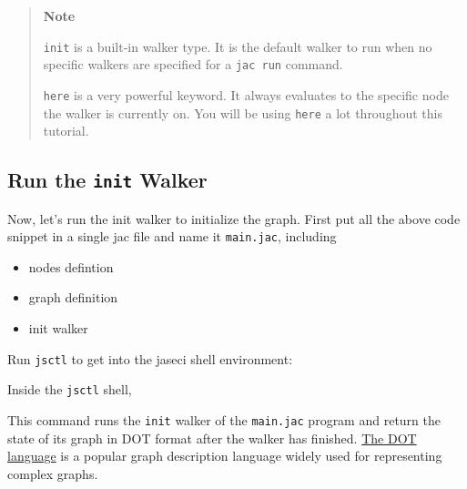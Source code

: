 \begin{quote}
    \textbf{Note}

    \texttt{init} is a built-in walker type. It is the default walker to run
    when no specific walkers are specified for a \texttt{jac\ run} command.

    \texttt{here} is a very powerful keyword. It always evaluates to the
    specific node the walker is currently on. You will be using
    \texttt{here} a lot throughout this tutorial.
\end{quote}

\subsection{\texorpdfstring{Run the \texttt{init}
        Walker}{Run the init Walker}}\label{run-the-init-walker}

Now, let's run the init walker to initialize the graph. First put all
the above code snippet in a single jac file and name it
\texttt{main.jac}, including

\begin{itemize}
    \tightlist
    \item
          nodes defintion
    \item
          graph definition
    \item
          init walker
\end{itemize}

Run \texttt{jsctl} to get into the jaseci shell environment:

\begin{Shaded}
    \begin{Highlighting}[]
    \end{Highlighting}
\end{Shaded}

Inside the \texttt{jsctl} shell,

\begin{Shaded}
    \begin{Highlighting}[]
         \OperatorTok{>}
    \end{Highlighting}
\end{Shaded}

This command runs the \texttt{init} walker of the \texttt{main.jac}
program and return the state of its graph in DOT format after the walker
has finished. \href{https://graphviz.org/doc/info/lang.html}{The DOT
    language} is a popular graph description language widely used for
representing complex graphs.

